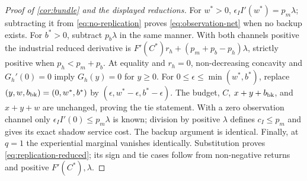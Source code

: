 \documentclass[11pt,a4paper]{article}
\theoremstyle{definition}\newtheorem{definition}{Definition}
\begin{document}
\begin{proof}[Proof of \cref{cor:bundle} and the displayed reductions]
For $w^*>0$, $\epsilon_II'(w^*)=p_m\lambda$; subtracting it from
\cref{eq:no-replication} proves \cref{eq:observation-net} when no
backup exists. For $b^*>0$, subtract $p_b\lambda$ in the same manner.
With both channels positive the industrial reduced derivative is
$F'(C^*)r_h+(p_m+p_b-p_h)\lambda$, strictly positive when
$p_h<p_m+p_b$. At equality and $r_h=0$, non-decreasing concavity and
$G_h'(0)=0$ imply $G_h(y)=0$ for $y\geq0$. For
$0\leq\epsilon\leq\min(w^*,b^*)$, replace
$(y,w,b_{\rm bk})=(0,w^*,b^*)$ by
$(\epsilon,w^*-\epsilon,b^*-\epsilon)$. The budget, $C$, $x+y+b_{\rm bk}$,
and $x+y+w$ are unchanged, proving the tie statement. With a zero
observation channel only $\epsilon_II'(0)\leq p_m\lambda$ is known;
division by positive $\lambda$ defines $c_I\leq p_m$ and gives its exact
shadow service cost. The backup argument is identical.
Finally, at $q=1$ the experiential marginal vanishes identically.
Substitution proves \cref{eq:replication-reduced}; its sign and tie cases
follow from non-negative returns and positive $F'(C^*),\lambda$.
\end{proof}
\end{document}
